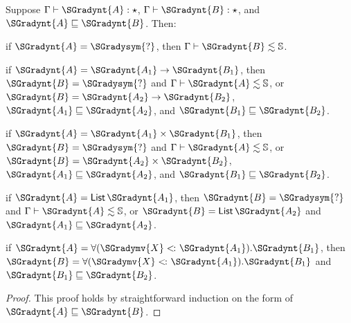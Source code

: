 \begin{lemma}
  \label{lemma:inversion_of_type_precision}
  Suppose $ \Gamma  \vdash  \SGradynt{A}  : \star $, $ \Gamma  \vdash  \SGradynt{B}  : \star $, and $ \SGradynt{A}  \sqsubseteq  \SGradynt{B} $.  Then:
  \begin{enumR}
  \item if $\SGradynt{A} = \SGradysym{\mbox{?}}$, then $ \Gamma  \vdash  \SGradynt{B}  \lesssim   \mathbb{S}  $.
  \item if $\SGradynt{A} = \SGradynt{A_{{\mathrm{1}}}}  \rightarrow  \SGradynt{B_{{\mathrm{1}}}}$, then
    $\SGradynt{B} = \SGradysym{\mbox{?}}$ and $ \Gamma  \vdash  \SGradynt{A}  \lesssim   \mathbb{S}  $, or $\SGradynt{B} = \SGradynt{A_{{\mathrm{2}}}}  \rightarrow  \SGradynt{B_{{\mathrm{2}}}}$, $ \SGradynt{A_{{\mathrm{1}}}}  \sqsubseteq  \SGradynt{A_{{\mathrm{2}}}} $, and $ \SGradynt{B_{{\mathrm{1}}}}  \sqsubseteq  \SGradynt{B_{{\mathrm{2}}}} $.
  \item if $\SGradynt{A} =  \SGradynt{A_{{\mathrm{1}}}}  \times  \SGradynt{B_{{\mathrm{1}}}} $, then
    $\SGradynt{B} = \SGradysym{\mbox{?}}$ and $ \Gamma  \vdash  \SGradynt{A}  \lesssim   \mathbb{S}  $, or $\SGradynt{B} =  \SGradynt{A_{{\mathrm{2}}}}  \times  \SGradynt{B_{{\mathrm{2}}}} $, $ \SGradynt{A_{{\mathrm{1}}}}  \sqsubseteq  \SGradynt{A_{{\mathrm{2}}}} $, and $ \SGradynt{B_{{\mathrm{1}}}}  \sqsubseteq  \SGradynt{B_{{\mathrm{2}}}} $.
  \item if $\SGradynt{A} =  \mathsf{List}\, \SGradynt{A_{{\mathrm{1}}}} $, then
    $\SGradynt{B} = \SGradysym{\mbox{?}}$ and $ \Gamma  \vdash  \SGradynt{A}  \lesssim   \mathbb{S}  $, or $\SGradynt{B} =  \mathsf{List}\, \SGradynt{A_{{\mathrm{2}}}} $ and $ \SGradynt{A_{{\mathrm{1}}}}  \sqsubseteq  \SGradynt{A_{{\mathrm{2}}}} $.
  \item if $\SGradynt{A} =  \forall ( \SGradymv{X}  <\hspace{-2px}\colon  \SGradynt{A_{{\mathrm{1}}}} ).  \SGradynt{B_{{\mathrm{1}}}} $, then
    $\SGradynt{B} =  \forall ( \SGradymv{X}  <\hspace{-2px}\colon  \SGradynt{A_{{\mathrm{1}}}} ).  \SGradynt{B_{{\mathrm{1}}}} $ and $ \SGradynt{B_{{\mathrm{1}}}}  \sqsubseteq  \SGradynt{B_{{\mathrm{2}}}} $.
  \end{enumR}
\end{lemma}
\begin{proof}
  This proof holds by straightforward induction on the form of $ \SGradynt{A}  \sqsubseteq  \SGradynt{B} $.
\end{proof}


